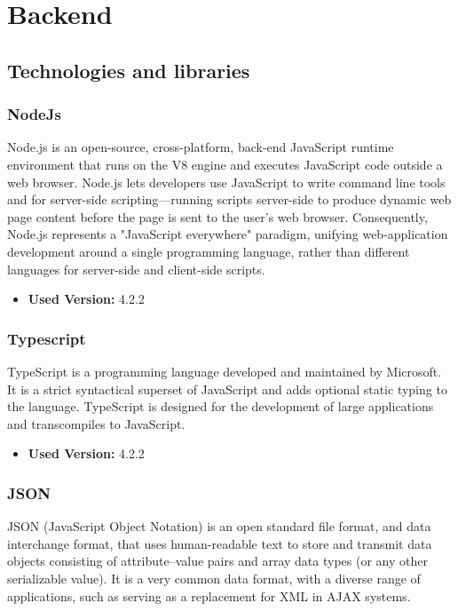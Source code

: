 \section{Backend}

\subsection{Technologies and libraries}

\subsubsection{NodeJs}
Node.js is an open-source, cross-platform, back-end JavaScript runtime environment that runs on the V8 engine and executes JavaScript code outside a web browser. Node.js lets developers use JavaScript to write command line tools and for server-side scripting—running scripts server-side to produce dynamic web page content before the page is sent to the user's web browser. Consequently, Node.js represents a "JavaScript everywhere" paradigm, unifying web-application development around a single programming language, rather than different languages for server-side and client-side scripts.

\begin{itemize}
    \item \textbf{Used Version:} 4.2.2
\end{itemize}

\subsubsection{Typescript}
TypeScript is a programming language developed and maintained by Microsoft. It is a strict syntactical superset of JavaScript and adds optional static typing to the language. TypeScript is designed for the development of large applications and transcompiles to JavaScript.

\begin{itemize}
    \item \textbf{Used Version:} 4.2.2
\end{itemize}

\subsubsection{JSON}
JSON (JavaScript Object Notation) is an open standard file format, and data interchange format, that uses human-readable text to store and transmit data objects consisting of attribute–value pairs and array data types (or any other serializable value). It is a very common data format, with a diverse range of applications, such as serving as a replacement for XML in AJAX systems.


